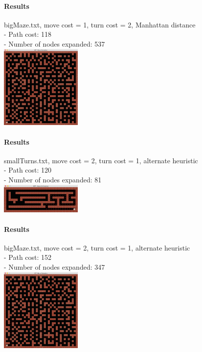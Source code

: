\begin{multicols*}{2}
\paragraph{Results}
bigMaze.txt, move cost = 1, turn cost = 2, Manhattan distance\\
- Path cost: 118\\
- Number of nodes expanded: 537\\
\includegraphics[width=0.3\textwidth]{graphics/bigMaze_turns12.png}

\paragraph{Results}
smallTurns.txt, move cost = 2, turn cost = 1, alternate heuristic\\
- Path cost: 120\\
- Number of nodes expanded: 81\\
\includegraphics[width=0.3\textwidth]{graphics/smallTurn_alt21.png}

\paragraph{Results}
bigMaze.txt, move cost = 2, turn cost = 1, alternate heuristic\\
- Path cost: 152\\
- Number of nodes expanded: 347\\
\includegraphics[width=0.3\textwidth]{graphics/bigMaze_alt21.png}


\end{multicols*}
